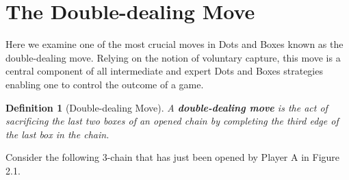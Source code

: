 \documentclass[12pt,twoside]{reedthesis}
\newtheorem{mydef}{Definition}
\begin{document}
\section{The Double-dealing Move}
Here we examine one of the most crucial moves in Dots and Boxes known as the double-dealing move.  Relying on the notion of voluntary capture, this move is a central component of all intermediate and expert Dots and Boxes strategies enabling one to control the outcome of a game.

\begin{mydef}[Double-dealing Move]
A \textbf{double-dealing move} is the act of sacrificing the last two boxes of an opened chain by completing the third edge of the last box in the chain.
\end{mydef}

\noindent
Consider the following 3-chain that has just been opened by Player A in Figure 2.1.
\end{document}
